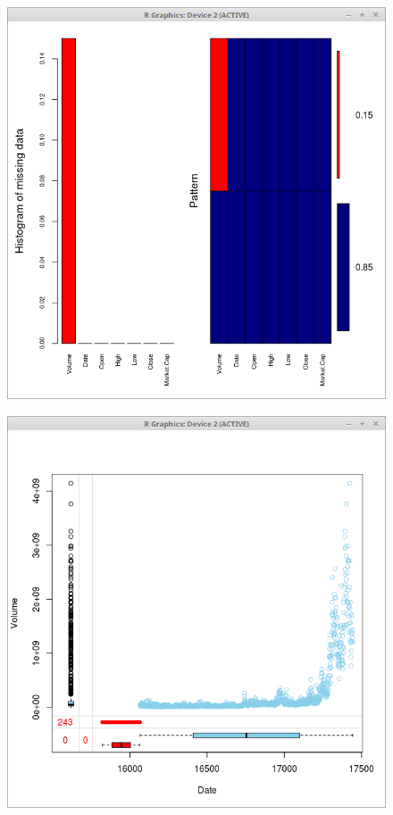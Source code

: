 \documentclass{article}
\begin{document}
\begin{figure}
\centering
\begin{minipage}{.5\textwidth}
  \centering
  \includegraphics[width=.8\linewidth]{btc_price_missing}
  \label{fig:test1}
\end{minipage}%
\begin{minipage}{.5\textwidth}
  \centering
  \includegraphics[width=.8\linewidth]{btc_price_missing_box_plot}
  \label{fig:test2}
\end{minipage}
\end{figure}
\end{document}
